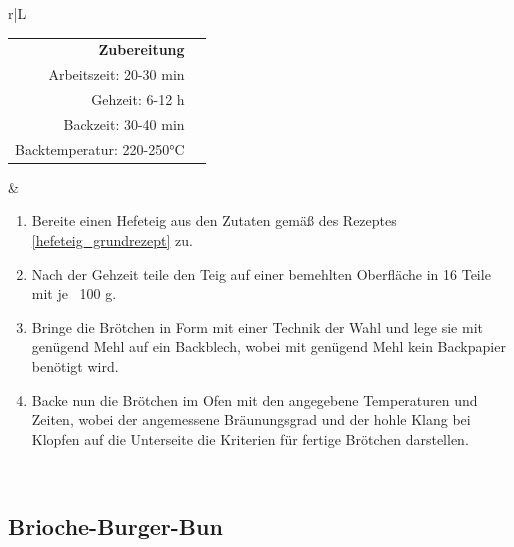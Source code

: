 \documentclass[a4paper, 12pt]{scrbook} 								%
\numberwithin{equation}{section} 									%
\begin{document}
\begin{tabularx}{\textwidth}{r|L}
		\begin{tabular}[t]{rr}
			\textbf{Zubereitung}	\\
			Arbeitszeit: 20-30 min	\\
			Gehzeit: 6-12 h			\\
			Backzeit: 30-40 min		\\
			Backtemperatur: 220-250°C \\
		\end{tabular}			&	\begin{enumerate}[]
										\item Bereite einen Hefeteig aus den Zutaten gemäß des Rezeptes \ref{hefeteig_grundrezept} zu.
										\item Nach der Gehzeit teile den Teig auf einer bemehlten Oberfläche in 16 Teile mit je ~100 g.
										\item Bringe die Brötchen in Form mit einer Technik der Wahl und lege sie mit genügend Mehl auf ein Backblech, wobei mit genügend Mehl kein Backpapier benötigt wird.
										\item Backe nun die Brötchen im Ofen mit den angegebene Temperaturen und Zeiten, wobei der angemessene Bräunungsgrad und der hohle Klang bei Klopfen auf die Unterseite die Kriterien für fertige Brötchen darstellen.
									\end{enumerate}	\\
		\end{tabularx}

		\newpage

		\subsection{Brioche-Burger-Bun}	\label{brioche_burger_bun}
\end{document}
